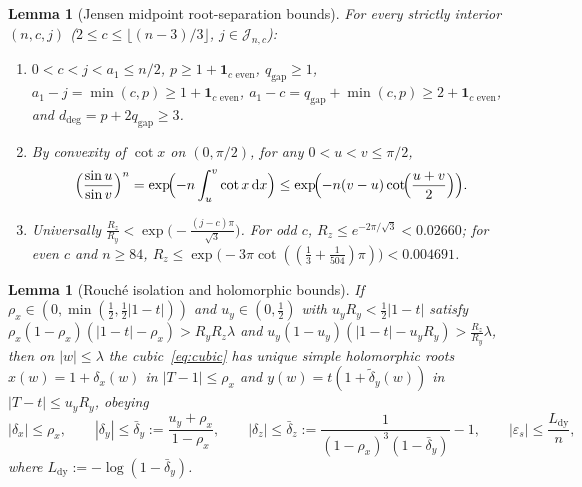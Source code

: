 \documentclass[10pt]{article}
\numberwithin{equation}{section}
\theoremstyle{plain}
\newtheorem{lemma}[theorem]{Lemma}
\theoremstyle{definition}
\newcommand{\dd}{\mathrm{d}}
\newcommand{\1}{\mathbf{1}}
\begin{document}
\begin{lemma}[Jensen midpoint root-separation bounds]\label{lem:jensen}
For every strictly interior $(n, c, j)$ ($2 \le c \le \lfloor (n-3)/3 \rfloor$, $j \in \mathcal{J}_{n,c}$):
\begin{enumerate}[label=\textup{(\arabic*)}]
    \item $0 < c < j < a_1 \le n/2$, $p \ge 1 + \1_{c\text{ even}}$, $q_{\mathrm{gap}} \ge 1$, $a_1 - j = \min(c, p) \ge 1 + \1_{c\text{ even}}$, $a_1 - c = q_{\mathrm{gap}} + \min(c, p) \ge 2 + \1_{c\text{ even}}$, and $d_{\mathrm{deg}} = p + 2q_{\mathrm{gap}} \ge 3$.
    \item By convexity of $\cot x$ on $(0, \pi/2)$, for any $0 < u < v \le \pi/2$,
    \begin{equation}\label{eq:jensen-sin}
    \Bigl(\frac{\sin u}{\sin v}\Bigr)^n = \exp\!\Bigl(-n\int_u^v \cot x\,\dd x\Bigr) \le \exp\!\Bigl(-n(v - u)\cot\!\Bigl(\frac{u + v}{2}\Bigr)\Bigr).
    \end{equation}
    \item Universally $\frac{R_z}{R_y} < \exp\bigl(-\frac{(j-c)\pi}{\sqrt{3}}\bigr)$. For odd $c$, $R_z \le e^{-2\pi/\sqrt{3}} < 0.02660$; for even $c$ and $n \ge 84$, $R_z \le \exp\bigl(-3\pi\cot((\frac{1}{3} + \frac{1}{504})\pi)\bigr) < 0.004691$.
\end{enumerate}
\end{lemma}

\begin{lemma}[Rouch\'e isolation and holomorphic bounds]\label{lem:rouche}
If $\rho_x \in (0, \min(\frac{1}{2}, \frac{1}{2}|1 - t|))$ and $u_y \in (0, \frac{1}{2})$ with $u_y R_y < \frac{1}{2}|1 - t|$ satisfy $\rho_x(1 - \rho_x)(|1 - t| - \rho_x) > R_y R_z \lambda$ and $u_y(1 - u_y)(|1 - t| - u_y R_y) > \frac{R_z}{R_y}\lambda$, then on $|w| \le \lambda$ the cubic~\eqref{eq:cubic} has unique simple holomorphic roots $x(w) = 1 + \delta_x(w)$ in $|T - 1| \le \rho_x$ and $y(w) = t(1 + \tilde{\delta}_y(w))$ in $|T - t| \le u_y R_y$, obeying
\[
|\delta_x| \le \rho_x, \qquad |\delta_y| \le \bar{\delta}_y := \frac{u_y + \rho_x}{1 - \rho_x}, \qquad
|\delta_z| \le \bar{\delta}_z := \frac{1}{(1-\rho_x)^3(1-\bar{\delta}_y)} - 1, \qquad
|\varepsilon_s| \le \frac{L_{\mathrm{dy}}}{n},
\]
where $L_{\mathrm{dy}} := -\log(1 - \bar{\delta}_y)$.
\end{lemma}
\end{document}
